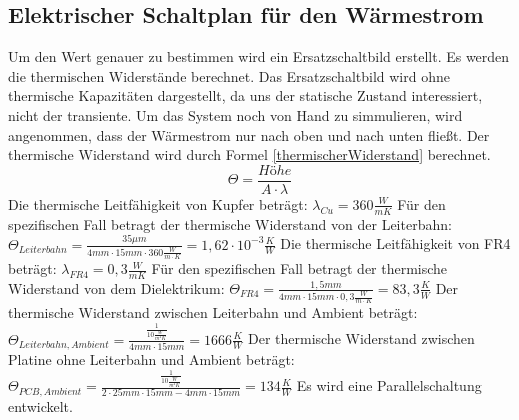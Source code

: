 \documentclass[10pt,a4paper,oneside,abstracton]{scrartcl}
\begin{document}
\begin{multicols}{2}
\subsection{Elektrischer Schaltplan für den Wärmestrom }
Um den Wert genauer zu bestimmen wird ein Ersatzschaltbild erstellt.
Es werden die thermischen Widerstände berechnet. 
Das Ersatzschaltbild wird ohne thermische Kapazitäten dargestellt, da uns der statische Zustand interessiert, nicht der transiente.
Um das System noch von Hand zu simmulieren, wird angenommen, dass der Wärmestrom nur nach oben und nach unten fließt. 
Der thermische Widerstand wird durch Formel \ref*{thermischerWiderstand} berechnet. 
\begin{equation}
	\Theta =  \frac{Höhe}{A \cdot \lambda}
	\label{thermischerWiderstand}
\end{equation}
\newline \noindent
Die thermische Leitfähigkeit von Kupfer beträgt:  \newline 
$\lambda_{Cu} = 360 \frac{W}{m K}$  \cite{Waermefluss} \newline
Für den spezifischen Fall betragt der thermische Widerstand von der Leiterbahn:  \newline
$\Theta_{Leiterbahn} = \frac{35 \mu m}{4mm \cdot 15mm \cdot 360 \frac{W}{m\cdot K}} = 1,62\cdot 10^{-3} \frac{K}{W}$
\newline \noindent
Die thermische Leitfähigkeit von FR4 beträgt: 
\newline
 $\lambda_{FR4} = 0,3 \frac{W}{m K}$ \cite{Waermefluss} \newline
Für den spezifischen Fall betragt der thermische Widerstand von dem Dielektrikum: 
\newline
$\Theta_{FR4} = \frac{1,5 mm}{4mm \cdot 15mm \cdot 0,3 \frac{W}{m\cdot K}} = 83,3 \frac{K}{W}$
\newline
Der thermische Widerstand zwischen Leiterbahn und Ambient beträgt: 
\newline
$\Theta_{Leiterbahn, Ambient} =  \frac{\frac{1}{10 \frac{W}{m^2K}}}{  4mm \cdot 15mm} = 1666 \frac{K}{W} $
\newline
Der thermische Widerstand zwischen Platine ohne Leiterbahn und Ambient beträgt: 
\newline
$\Theta_{PCB, Ambient} = \frac{\frac{1}{10 \frac{W}{m^2K}}}{ 2\cdot 25mm \cdot 15mm - 4mm \cdot 15mm} = 134 \frac{K}{W} $
\newline
Es wird eine Parallelschaltung entwickelt. 
\newline

\end{multicols}
\end{document}
